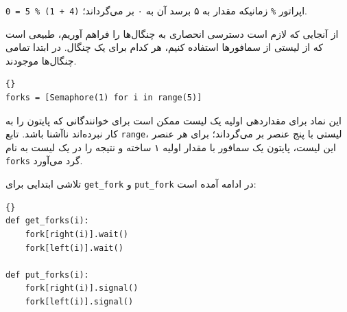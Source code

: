 \documentclass{book}
\begin{document}
    اپراتور {\tt \%} زمانیکه مقدار به ۵ برسد آن به ۰ بر می‌گرداند؛ {\tt (4 + 1) \% 5 = 0}.

    از آنجایی که لازم است دسترسی انحصاری به چنگال‌ها را فراهم آوریم، طبیعی است که از لیستی از سمافورها استفاده کنیم، هر کدام برای یک چنگال. 
    در ابتدا تمامی چنگال‌ها موجودند. 

\begin{latin}
\begin{latin}
\begin{lstlisting}[title=\rl{متغیرهای غذا خوردن فیلسوف‌ها}]{}
forks = [Semaphore(1) for i in range(5)]
\end{lstlisting}
\end{latin}
\end{latin}

    این نماد برای مقداردهی اولیه یک لیست ممکن است برای خوانندگانی که  پایتون را به کار نبرده‌اند ناآشنا باشد. 
    تابع {\tt range}، لیستی با پنج عنصر بر‌ می‌گرداند؛ برای هر عنصر این لیست، پایتون یک سمافور با مقدار اولیه ۱ ساخته و نتیجه را در یک لیست 
    به نام  {\tt forks} گرد می‌آورد.  

    تلاشی ابتدایی برای  {\tt get\_fork} و {\tt put\_fork} در ادامه آمده است:

\begin{latin}
\begin{latin}
\begin{lstlisting}[title=\rl{نا راه حل غذا خوردن فیلسوف}]{}
def get_forks(i):
    fork[right(i)].wait()
    fork[left(i)].wait()

def put_forks(i):
    fork[right(i)].signal()
    fork[left(i)].signal()
\end{lstlisting}
\end{latin}
\end{latin}
\end{document}
